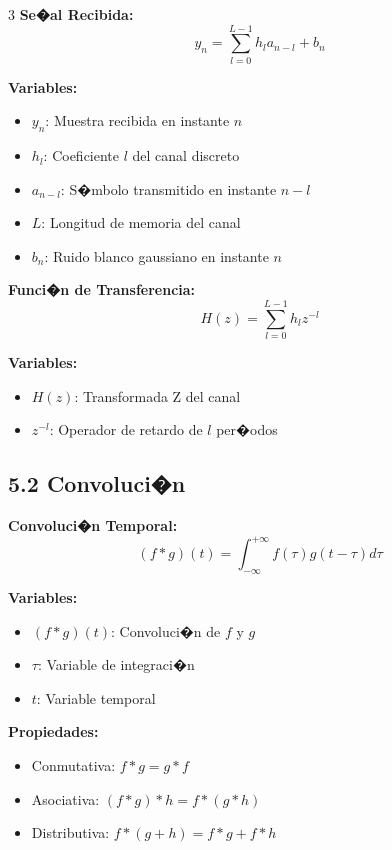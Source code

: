 ﻿\documentclass[8pt,a4paper]{article}
\begin{document}
\begin{multicols}{3}
\textbf{Se�al Recibida:}
\[
y_n = \sum_{l=0}^{L-1} h_l a_{n-l} + b_n
\]

\textbf{Variables:}
\begin{itemize}[leftmargin=*,itemsep=0pt]
    \item $y_n$: Muestra recibida en instante $n$
    \item $h_l$: Coeficiente $l$ del canal discreto
    \item $a_{n-l}$: S�mbolo transmitido en instante $n-l$
    \item $L$: Longitud de memoria del canal
    \item $b_n$: Ruido blanco gaussiano en instante $n$
\end{itemize}

\textbf{Funci�n de Transferencia:}
\[
H(z) = \sum_{l=0}^{L-1} h_l z^{-l}
\]

\textbf{Variables:}
\begin{itemize}[leftmargin=*,itemsep=0pt]
    \item $H(z)$: Transformada Z del canal
    \item $z^{-l}$: Operador de retardo de $l$ per�odos
\end{itemize}

\vspace{-2mm}
\subsection*{\small 5.2 Convoluci�n}
\vspace{-2mm}

\textbf{Convoluci�n Temporal:}
\[
(f * g)(t) = \int_{-\infty}^{+\infty} f(\tau) g(t-\tau) d\tau
\]

\textbf{Variables:}
\begin{itemize}[leftmargin=*,itemsep=0pt]
    \item $(f * g)(t)$: Convoluci�n de $f$ y $g$
    \item $\tau$: Variable de integraci�n
    \item $t$: Variable temporal
\end{itemize}

\textbf{Propiedades:}
\begin{itemize}[leftmargin=*,itemsep=0pt]
    \item Conmutativa: $f * g = g * f$
    \item Asociativa: $(f * g) * h = f * (g * h)$
    \item Distributiva: $f * (g + h) = f * g + f * h$
\end{itemize}


\end{multicols}
\end{document}
